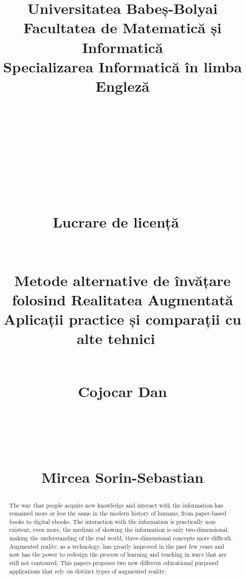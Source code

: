 \documentclass[12 pct]{report}
\begin{document}
\begin{titlepage}
\title{%
  { \huge Universitatea Babeș-Bolyai\\
  Facultatea de Matematică și Informatică\\
  Specializarea Informatică în limba Engleză \\
  }
  \ \\
  \ \\
  \ \\
  \ \\
  \ \\
  \ \\
  {\huge Lucrare de licență}
  \ \\
  \ \\
  \ \\
  Metode alternative de învățare folosind Realitatea Augmentată\\
  Aplicații practice și comparații cu alte tehnici
  \ \\
  \ \\
  {%
    \begin{flushleft}%
  	 Cojocar Dan
  	\end{flushleft}}
  \ \\
  \ \\
  {%
  \begin{flushright}
  	Mircea Sorin-Sebastian
  \end{flushright} }
}%
\maketitle
\end{titlepage}

\begin{abstract}
The way that people acquire new knowledge and interact with the information has remained more or less the same in the modern history of humans, from paper-based books to digital ebooks. The interaction with the information is practically non-existent, even more, the medium of showing the information is only two-dimensional, making the understanding of the real world, three-dimensional concepts more difficult. Augmented reality, as a technology, has greatly improved in the past few years and now has the power to redesign the process of learning and teaching in ways that are still not contoured. This papers proposes two new different educational purposed applications that rely on distinct types of augmented reality.
\end{abstract}

\tableofcontents
\end{document}
